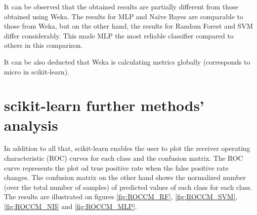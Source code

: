 


It can be observed that the obtained results are partially different from those obtained using Weka. The results for MLP and Naïve Bayes are comparable to those from Weka, but on the other hand, the results for Random Forest and SVM differ considerably. This made MLP the most reliable classifier compared to others in this comparison.

It can be also deducted that Weka is calculating metrics globally (corresponds to micro in scikit-learn).

\section{scikit-learn further methods' analysis}

In addition to all that, scikit-learn enables the user to plot the receiver operating characteristic (ROC) curves for each class and the confusion matrix. The ROC curve represents the plot od true positive rate when the false positive rate changes. The confusion matrix on the other hand shows the normalized number (over the total number of samples) of predicted values of each class for each class. The results are illustrated on figures \ref{fig:ROCCM_RF}, \ref{fig:ROCCM_SVM}, \ref{fig:ROCCM_NB} and \ref{fig:ROCCM_MLP}.

